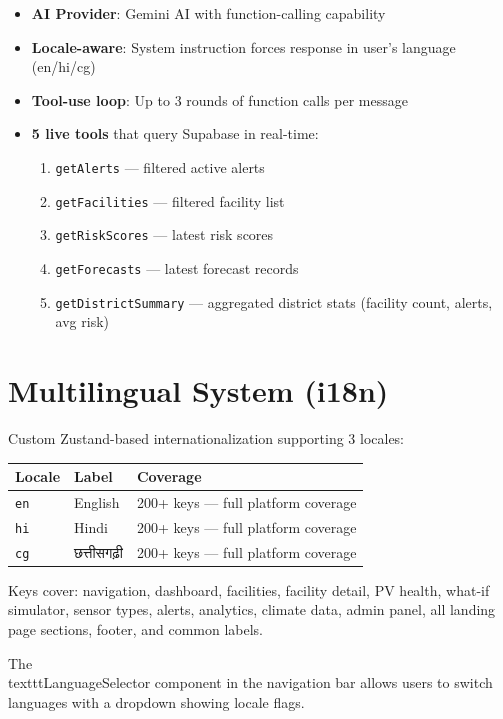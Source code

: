 \documentclass[12pt,a4paper]{report}
\begin{document}
\begin{itemize}[nosep]
  \item \textbf{AI Provider}: Gemini AI with function-calling capability
  \item \textbf{Locale-aware}: System instruction forces response in user's language (en/hi/cg)
  \item \textbf{Tool-use loop}: Up to 3 rounds of function calls per message
  \item \textbf{5 live tools} that query Supabase in real-time:
    \begin{enumerate}[nosep]
      \item \texttt{getAlerts} --- filtered active alerts
      \item \texttt{getFacilities} --- filtered facility list
      \item \texttt{getRiskScores} --- latest risk scores
      \item \texttt{getForecasts} --- latest forecast records
      \item \texttt{getDistrictSummary} --- aggregated district stats (facility count, alerts, avg risk)
    \end{enumerate}
\end{itemize}

\section{Multilingual System (i18n)}

Custom Zustand-based internationalization supporting 3 locales:

\begin{tabularx}{\textwidth}{llX}
\toprule
\textbf{Locale} & \textbf{Label} & \textbf{Coverage} \\
\midrule
\texttt{en} & English            & 200+ keys --- full platform coverage \\
\texttt{hi} & Hindi              & 200+ keys --- full platform coverage \\
\texttt{cg} & छत्तीसगढ़ी         & 200+ keys --- full platform coverage \\
\bottomrule
\end{tabularx}

Keys cover: navigation, dashboard, facilities, facility detail, PV health, what-if simulator, sensor types, alerts, analytics, climate data, admin panel, all landing page sections, footer, and common labels.

The \\texttt{LanguageSelector} component in the navigation bar allows users to switch languages with a dropdown showing locale flags.
\end{document}
